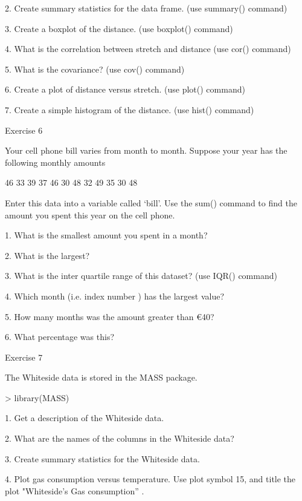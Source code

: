 2.
Create summary statistics for the data frame.   (use summary() command)

3.
Create a boxplot of the distance.   (use boxplot() command)

4.
What is the correlation between stretch and distance (use cor() command)

5.
What is the covariance?  (use cov() command)

6.
Create a plot of distance versus stretch.  (use plot() command)             

7.
Create a simple histogram of the distance. (use hist() command)


 

Exercise 6

 

Your cell phone bill varies from month to month. Suppose your year has the following monthly amounts

 

46 33 39 37 46 30 48 32 49 35 30 48

 

Enter this data into a variable called ‘bill’. Use the sum() command to find the amount you spent this year on the cell phone.

 

1.      What is the smallest amount you spent in a month?

2.      What is the largest?

3.      What is the inter quartile range of this dataset?  (use IQR() command)

4.      Which month (i.e. index number ) has the largest value?

5.      How many months was the amount greater than €40?

6.      What percentage was this?

 

 Exercise 7

 

The Whiteside data is stored in the MASS package.

 

> library(MASS)

 
1.
Get a description of the Whiteside data.

2.
What are the names of the columns in the Whiteside data?

3.
Create summary statistics for the Whiteside data.

4.
Plot gas consumption versus temperature. Use plot symbol 15, and title the plot "Whiteside’s Gas consumption” .


